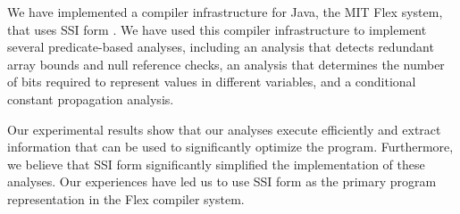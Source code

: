 We have implemented a compiler infrastructure for Java,
the MIT Flex system, that uses SSI form \cite{flexweb}.
We have used this compiler infrastructure to implement several 
predicate-based analyses, including an analysis that
detects redundant array bounds and null reference checks, an
analysis that determines the number of bits
required to represent values in different variables,
and a conditional constant propagation analysis.

Our experimental results show that our analyses
execute efficiently and extract information that can
be used to significantly optimize the program.
Furthermore, we believe that SSI form significantly
simplified the implementation of these analyses.
Our experiences have led us to use SSI form 
as the primary program representation in the Flex
compiler system.
